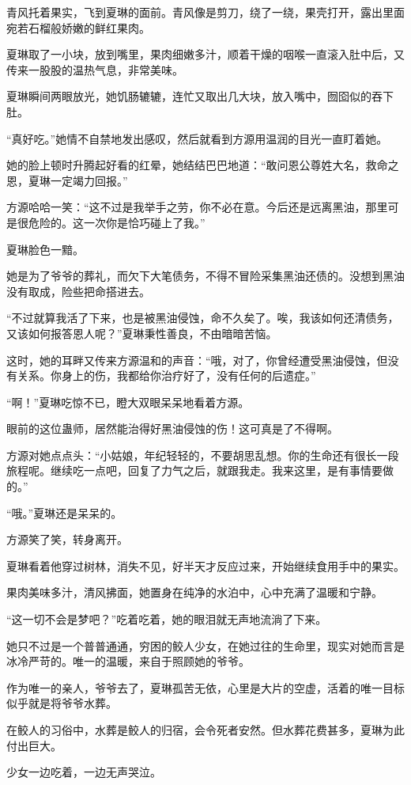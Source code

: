 \begin{this_body}
青风托着果实，飞到夏琳的面前。青风像是剪刀，绕了一绕，果壳打开，露出里面宛若石榴般娇嫩的鲜红果肉。

夏琳取了一小块，放到嘴里，果肉细嫩多汁，顺着干燥的咽喉一直滚入肚中后，又传来一股股的温热气息，非常美味。

夏琳瞬间两眼放光，她饥肠辘辘，连忙又取出几大块，放入嘴中，囫囵似的吞下肚。

“真好吃。”她情不自禁地发出感叹，然后就看到方源用温润的目光一直盯着她。

她的脸上顿时升腾起好看的红晕，她结结巴巴地道：“敢问恩公尊姓大名，救命之恩，夏琳一定竭力回报。”

方源哈哈一笑：“这不过是我举手之劳，你不必在意。今后还是远离黑油，那里可是很危险的。这一次你是恰巧碰上了我。”

夏琳脸色一黯。

她是为了爷爷的葬礼，而欠下大笔债务，不得不冒险采集黑油还债的。没想到黑油没有取成，险些把命搭进去。

“不过就算我活了下来，也是被黑油侵蚀，命不久矣了。唉，我该如何还清债务，又该如何报答恩人呢？”夏琳秉性善良，不由暗暗苦恼。

这时，她的耳畔又传来方源温和的声音：“哦，对了，你曾经遭受黑油侵蚀，但没有关系。你身上的伤，我都给你治疗好了，没有任何的后遗症。”

“啊！”夏琳吃惊不已，瞪大双眼呆呆地看着方源。

眼前的这位蛊师，居然能治得好黑油侵蚀的伤！这可真是了不得啊。

方源对她点点头：“小姑娘，年纪轻轻的，不要胡思乱想。你的生命还有很长一段旅程呢。继续吃一点吧，回复了力气之后，就跟我走。我来这里，是有事情要做的。”

“哦。”夏琳还是呆呆的。

方源笑了笑，转身离开。

夏琳看着他穿过树林，消失不见，好半天才反应过来，开始继续食用手中的果实。

果肉美味多汁，清风拂面，她置身在纯净的水泊中，心中充满了温暖和宁静。

“这一切不会是梦吧？”吃着吃着，她的眼泪就无声地流淌了下来。

她只不过是一个普普通通，穷困的鲛人少女，在她过往的生命里，现实对她而言是冰冷严苛的。唯一的温暖，来自于照顾她的爷爷。

作为唯一的亲人，爷爷去了，夏琳孤苦无依，心里是大片的空虚，活着的唯一目标似乎就是将爷爷水葬。

在鲛人的习俗中，水葬是鲛人的归宿，会令死者安然。但水葬花费甚多，夏琳为此付出巨大。

少女一边吃着，一边无声哭泣。


\end{this_body}
